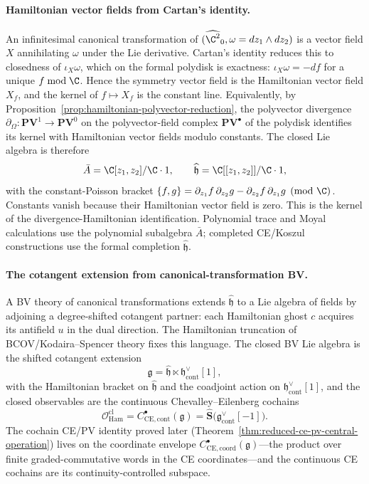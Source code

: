 \documentclass[11pt]{memoir}
\begin{document}
\paragraph{Hamiltonian vector fields from Cartan's identity.}
An infinitesimal canonical transformation of
\((\widehat{\C^2}_0,\omega=dz_1\wedge dz_2)\) is a vector field
\(X\) annihilating \(\omega\) under the Lie derivative.  Cartan's
identity reduces this to closedness of \(\iota_X\omega\), which on the
formal polydisk is exactness: \(\iota_X\omega=-df\) for a unique
\(f\bmod\C\).  Hence the symmetry vector field is the Hamiltonian
vector field \(X_f\), and the kernel of \(f\mapsto X_f\) is the constant
line.  Equivalently, by
Proposition~\ref{prop:hamiltonian-polyvector-reduction}, the polyvector
divergence
\(\partial_\Omega\colon\mathbf{PV}^1\to\mathbf{PV}^0\) on the
polyvector-field complex \(\mathbf{PV}^\bullet\) of the polydisk
identifies its kernel with Hamiltonian vector fields modulo
constants.  The closed
Lie algebra is therefore
\begin{equation}\label{eq:hbar-Lie-algebra}
\bar A=\C[z_1,z_2]/\C\cdot1,\qquad
\widehat{\mathfrak h}=\C[[z_1,z_2]]/\C\cdot1,
\end{equation}
with the constant-Poisson bracket
\(\{f,g\}=\partial_{z_1}f\,\partial_{z_2}g
-\partial_{z_2}f\,\partial_{z_1}g\pmod\C\).  Constants vanish because
their Hamiltonian vector field is zero.
This is the kernel of the divergence-Hamiltonian identification.
Polynomial trace and Moyal calculations use the polynomial subalgebra
\(\bar A\); completed CE/Koszul constructions use the formal completion
\(\widehat{\mathfrak h}\).

\paragraph{The cotangent extension from canonical-transformation BV.}
A BV theory of canonical transformations extends \(\widehat{\mathfrak h}\)
to a Lie algebra of fields by adjoining a degree-shifted cotangent
  partner: each Hamiltonian ghost \(c\) acquires its antifield \(u\) in
  the dual direction.  The Hamiltonian truncation of
  BCOV/Kodaira--Spencer theory \cite{bcov} fixes this language.  The
  closed BV Lie algebra is
the shifted cotangent extension
\begin{equation}\label{eq:cotangent-Lie-algebra}
\mathfrak g=\widehat{\mathfrak h}\ltimes
  \mathfrak h^\vee_{\mathrm{cont}}[1],
\end{equation}
with the Hamiltonian bracket on \(\widehat{\mathfrak h}\) and the
coadjoint action on \(\mathfrak h^\vee_{\mathrm{cont}}[1]\), and the
closed observables are the continuous Chevalley--Eilenberg cochains
\[
\mathcal{O}^{\mathrm{cl}}_{\mathrm{Ham}}
  =C^\bullet_{\mathrm{CE},\mathrm{cont}}(\mathfrak g)
  =\widehat{\mathbf S}\bigl(\mathfrak g^\vee_{\mathrm{cont}}[-1]\bigr).
\]
The cochain CE/PV identity proved later
(Theorem~\ref{thm:reduced-ce-pv-central-operation}) lives on the
coordinate envelope
\(C^\bullet_{\mathrm{CE},\mathrm{coord}}(\mathfrak g)\)---the product
over finite graded-commutative words in the CE coordinates---and the
continuous CE cochains are its continuity-controlled subspace.
\end{document}
